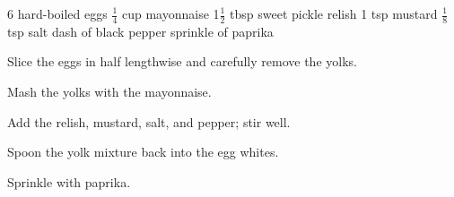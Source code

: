 \dishtype{\side}
\dishother{\vegetarian}
\begin{ingreds}
    6 hard-boiled eggs
    $\frac{1}{4}$ cup mayonnaise
    1$\frac{1}{2}$ tbsp sweet pickle relish
    1 tsp mustard
    $\frac{1}{8}$ tsp salt
    dash of black pepper
    sprinkle of paprika
\end{ingreds}
\begin{method}
    Slice the eggs in half lengthwise and carefully remove the yolks.\par
    Mash the yolks with the mayonnaise.\par
    Add the relish, mustard, salt, and pepper; stir well.\par
    Spoon the yolk mixture back into the egg whites.\par
    Sprinkle with paprika.
\end{method}